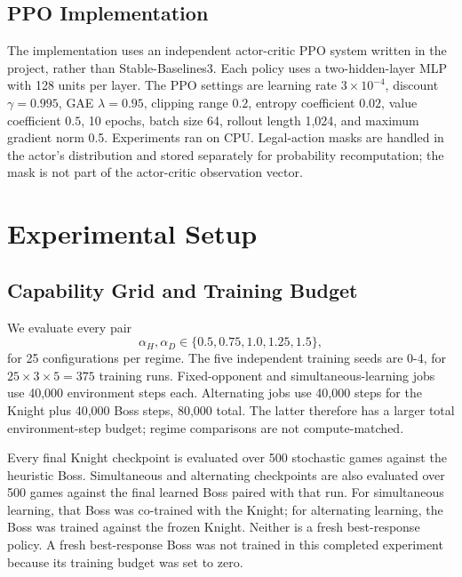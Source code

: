 \documentclass{article}
\begin{document}
\subsection{PPO Implementation}
The implementation uses an independent actor-critic PPO system written in the project, rather than Stable-Baselines3. Each policy uses a two-hidden-layer MLP with 128 units per layer. The PPO settings are learning rate $3\times10^{-4}$, discount $\gamma=0.995$, GAE $\lambda=0.95$, clipping range $0.2$, entropy coefficient $0.02$, value coefficient $0.5$, 10 epochs, batch size 64, rollout length 1,024, and maximum gradient norm 0.5. Experiments ran on CPU. Legal-action masks are handled in the actor's distribution and stored separately for probability recomputation; the mask is not part of the actor-critic observation vector.

\section{Experimental Setup}
\subsection{Capability Grid and Training Budget}
We evaluate every pair
\begin{equation}
\alpha_H,\alpha_D\in\{0.5,0.75,1.0,1.25,1.5\},
\end{equation}
for 25 configurations per regime. The five independent training seeds are 0-4, for $25\times3\times5=375$ training runs. Fixed-opponent and simultaneous-learning jobs use 40,000 environment steps each. Alternating jobs use 40,000 steps for the Knight plus 40,000 Boss steps, 80,000 total. The latter therefore has a larger total environment-step budget; regime comparisons are not compute-matched.

Every final Knight checkpoint is evaluated over 500 stochastic games against the heuristic Boss. Simultaneous and alternating checkpoints are also evaluated over 500 games against the final learned Boss paired with that run. For simultaneous learning, that Boss was co-trained with the Knight; for alternating learning, the Boss was trained against the frozen Knight. Neither is a fresh best-response policy. A fresh best-response Boss was not trained in this completed experiment because its training budget was set to zero.
\end{document}
